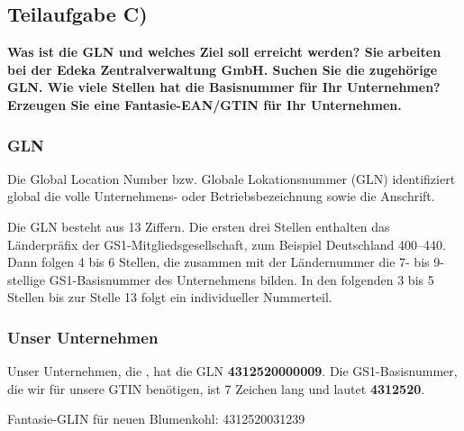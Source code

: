 \subsection{Teilaufgabe C)}
\textbf{Was ist die GLN und welches Ziel soll erreicht werden? Sie arbeiten bei der Edeka
Zentralverwaltung GmbH. Suchen Sie die zugehörige GLN. Wie viele Stellen hat die
Basisnummer für Ihr Unternehmen? Erzeugen Sie eine Fantasie-EAN/GTIN für Ihr
Unternehmen.}

\subsubsection{GLN}
Die Global Location Number bzw. Globale Lokationsnummer (GLN) identifiziert
global die volle Unternehmens- oder Betriebsbezeichnung sowie die Anschrift. 

Die GLN besteht aus 13 Ziffern. Die ersten drei Stellen enthalten das
Länderpräfix der GS1-Mitgliedsgesellschaft, zum Beispiel Deutschland 400–440.
Dann folgen 4 bis 6 Stellen, die zusammen mit der Ländernummer die 7- bis
9-stellige GS1-Basisnummer des Unternehmens bilden. In den folgenden 3 bis 5
Stellen bis zur Stelle 13 folgt ein individueller Nummerteil.

\subsubsection{Unser Unternehmen}
Unser Unternehmen, die , hat die GLN
\textbf{4312520000009}. Die GS1-Basisnummer, die wir für unsere GTIN benötigen,
ist 7 Zeichen lang und lautet \textbf{4312520}.

Fantasie-GLIN für neuen Blumenkohl: 4312520031239

\clearpage 